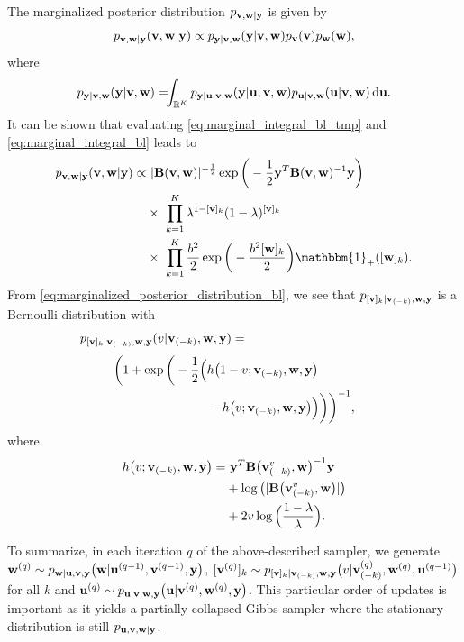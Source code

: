 \documentclass[journal]{IEEEtran}
\begin{document}
The marginalized posterior distribution $p_{{\bf{v}}, {\bf{w}} | {\bf{y}}}$ is given by 
\begin{align}\label{eq:marginal_integral_bl_tmp}
    p_{{\bf{v}}, {\bf{w}} | {\bf{y}}}({\bf{v}}, {\bf{w}} | {\bf{y}}) \propto p_{{\bf{y}}|{\bf{v}}, {\bf{w}}}({\bf{y}}|{\bf{v}}, {\bf{w}}) p_{{\bf{v}}}({\bf{v}}) p_{{\bf{w}}}({\bf{w}}), 
\end{align}
where 
\begin{equation}\label{eq:marginal_integral_bl}
    p_{\M y|\M v, \M w}(\M y|\M v, \M w) = \hspace{-0.15cm} \int_{\R^K} p_{\M y|\M u, \M v, \M w}(\M y | \M u, \M v, \M w) p_{\M u|\M v, \M w}(\M u|\M v, \M w) \ud \M u.
\end{equation}
It can be shown that evaluating \eqref{eq:marginal_integral_bl_tmp} and \eqref{eq:marginal_integral_bl} leads to
\begin{align}\label{eq:marginalized_posterior_distribution_bl}
    p_{\M v, \M w | \M y}(\M v, \M w | \M y) \propto& \ |\M B(\M v, \M w)|^{-\frac{1}{2}} \exp\bigg(-\frac{1}{2} \M y^{T} \M B(\M v, \M w)^{-1} \M y \bigg) \nonumber \\
    &\times \ \prod_{k=1}^{K} \lambda^{1-[\M v]_k}(1-\lambda)^{[\M v]_k} \nonumber \\
    &\times \ \prod_{k=1}^{K} \frac{b^2}{2}\exp\bigg(-\frac{b^2 [\M w]_k}{2}\bigg) \mathbbm{1}_{+}([\M w]_k).
\end{align}
From \eqref{eq:marginalized_posterior_distribution_bl}, we see that $p_{[{\bf{v}}]_k | {\bf{v}}_{(-k)}, {\bf{w}}, {\bf{y}}}$ is a Bernoulli distribution with
\begin{align*}
    p_{[\M v]_k | \M v_{(-k)}, \M w, \M y}(v|\M v_{(-k)}, \M w, \M y) = \hspace{4cm}
\end{align*}
\begin{align} 
    \bigg(1 + \exp\bigg(-\frac{1}{2}\Big(&h\big(1-v; {\bf{v}}_{(-k)}, {\bf{w}}, {\bf{y}}\big) \nonumber \\
    &- h\big(v; {\bf{v}}_{(-k)}, {\bf{w}}, {\bf{y}}\big)\Big)\bigg)\bigg)^{-1},
\end{align}
where
\begin{align}
    h\big(v; {\bf{v}}_{(-k)}, {\bf{w}}, {\bf{y}}\big) =& \ {\bf{y}}^{T} {\bf{B}}\big({\bf{v}}_{(-k)}^{v}, {\bf{w}}\big)^{-1} {\bf{y}} \nonumber \\
    &+ \log\big(|{\bf{B}}\big({\bf{v}}_{(-k)}^{v}, {\bf{w}}\big)|\big) \nonumber \\
    &+ 2 v \log\Big(\frac{1-\lambda}{\lambda}\Big).
\end{align}

To summarize, in each iteration $q$ of the above-described sampler, we generate ${\bf{w}}^{(q)} \sim p_{{\bf{w}} | {\bf{u}}, {\bf{v}}, {\bf{y}}}\big({\bf{w}} | {\bf{u}}^{(q-1)}, {\bf{v}}^{(q-1)}, {\bf{y}}\big)$, $[{\bf{v}}^{(q)}]_k \sim p_{[{\bf{v}}]_k | {\bf{v}}_{(-k)}, {\bf{w}}, {\bf{y}}}\big(v | {\bf{v}}_{(-k)}^{(q)}, {\bf{w}}^{(q)}, {\bf{u}}^{(q-1)}\big)$ for all $k$ and ${\bf{u}}^{(q)} \sim p_{{\bf{u}} | {\bf{v}}, {\bf{w}},{\bf{y}}}\big({\bf{u}} | {\bf{v}}^{(q)}, {\bf{w}}^{(q)}, {\bf{y}}\big)$. This particular order of updates is important as it yields a partially collapsed Gibbs sampler \cite{van2008partially} where the stationary distribution is still $p_{{\bf{u}}, {\bf{v}}, {\bf{w}} | {\bf{y}}}$.   
\end{document}

